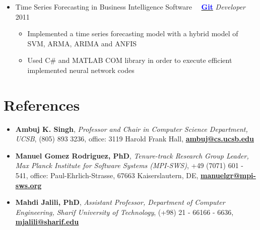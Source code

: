\documentclass[letter]{res}
\begin{document}
\begin{resume}
\begin{itemize}[leftmargin=-.1in]
			\item Time Series Forecasting in Business Intelligence Software ~~{\href{https://github.com/omid55/time_series_forecasting_business_intelligence}{\textbf{\textcolor{blue}{Git}}}}
			\newline
			{\sl Developer} \hfill 2011\\
			\vspace{-4mm}
			\iflong
			\begin{itemize}
				\item Implemented a time series forecasting model with a hybrid model of SVM, ARMA, ARIMA and ANFIS
				\item Used C\# and MATLAB COM library in order to execute efficient implemented neural network codes
			\end{itemize}
			\fi
			
		\end{itemize}
		
		
		\section{References}
		\begin{itemize}[leftmargin=-.1in]
		\item \textbf{Ambuj K. Singh}, \textit{Professor and Chair in Computer Science Department, UCSB}, (805) 893 3236, office: 3119 Harold Frank Hall, \href{mailto:manuelgr@mpi-sws.org}{\textbf{ambuj@cs.ucsb.edu}}
		
		\item \textbf{Manuel Gomez Rodriguez, PhD}, \textit{Tenure-track Research Group Leader, Max Planck Institute for Software Systems (MPI-SWS)}, +49 (7071) 601 - 541, office: Paul-Ehrlich-Strasse, 67663 Kaiserslautern, DE, \href{mailto:manuelgr@mpi-sws.org}{\textbf{manuelgr@mpi-sws.org}}
		
		\item \textbf{Mahdi Jalili, PhD}, \textit{Assistant Professor, Department of Computer Engineering, Sharif University of Technology}, (+98) 21 - 66166 - 6636, \href{mailto: mjalili@sharif.edu}{\textbf{mjalili@sharif.edu}}\\
		\end{itemize}
		\centerline{}
		
	\end{resume}
\end{document}
